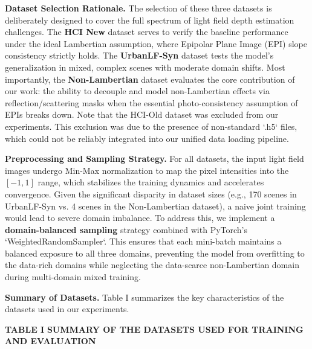 \textbf{Dataset Selection Rationale.} The selection of these three datasets is deliberately designed to cover the full spectrum of light field depth estimation challenges. The \textbf{HCI New} dataset serves to verify the baseline performance under the ideal Lambertian assumption, where Epipolar Plane Image (EPI) slope consistency strictly holds. The \textbf{UrbanLF-Syn} dataset tests the model's generalization in mixed, complex scenes with moderate domain shifts. Most importantly, the \textbf{Non-Lambertian} dataset evaluates the core contribution of our work: the ability to decouple and model non-Lambertian effects via reflection/scattering masks when the essential photo-consistency assumption of EPIs breaks down. Note that the HCI-Old dataset was excluded from our experiments. This exclusion was due to the presence of non-standard `.h5` files, which could not be reliably integrated into our unified data loading pipeline.

\textbf{Preprocessing and Sampling Strategy.} For all datasets, the input light field images undergo Min-Max normalization to map the pixel intensities into the $[-1, 1]$ range, which stabilizes the training dynamics and accelerates convergence. Given the significant disparity in dataset sizes (e.g., 170 scenes in UrbanLF-Syn vs. 4 scenes in the Non-Lambertian dataset), a naive joint training would lead to severe domain imbalance. To address this, we implement a \textbf{domain-balanced sampling} strategy combined with PyTorch's `WeightedRandomSampler`. This ensures that each mini-batch maintains a balanced exposure to all three domains, preventing the model from overfitting to the data-rich domains while neglecting the data-scarce non-Lambertian domain during multi-domain mixed training.

\textbf{Summary of Datasets.} Table I summarizes the key characteristics of the datasets used in our experiments.

\textbf{TABLE I}
\textbf{SUMMARY OF THE DATASETS USED FOR TRAINING AND EVALUATION}

\begin{table}[!t]
\small
\caption{Dataset Scene Type Scene Count.}
\label{tab:table1}
\centering
{}
\end{table}
